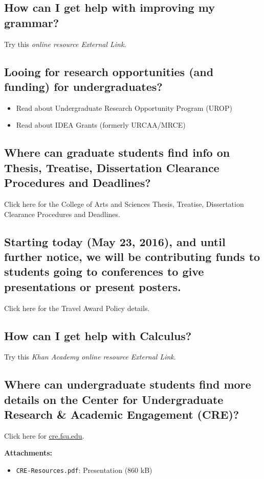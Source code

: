 \documentclass[12pt,a4paper]{article}
\begin{document}
\subsection{How can I get help with improving my grammar?}
Try this \textit{online resource External Link}.

\subsection{Looing for research opportunities (and funding) for undergraduates?}
\begin{itemize}
    \item Read about Undergraduate Research Opportunity Program (UROP)
    \item Read about IDEA Grants (formerly URCAA/MRCE)
\end{itemize}

\subsection{Where can graduate students find info on Thesis, Treatise, Dissertation Clearance Procedures and Deadlines?}
Click here for the College of Arts and Sciences Thesis, Treatise, Dissertation Clearance Procedures and Deadlines.

\subsection{Starting today (May 23, 2016), and until further notice, we will be contributing funds to students going to conferences to give presentations or present posters.}
Click here for the Travel Award Policy details.

\subsection{How can I get help with Calculus?}
Try this \textit{Khan Academy online resource External Link}.

\subsection{Where can undergraduate students find more details on the Center for Undergraduate Research \& Academic Engagement (CRE)?}
Click here for \href{http://cre.fsu.edu}{cre.fsu.edu}.
\vspace{1em}

\noindent\textbf{Attachments:}
\begin{itemize}
    \item \texttt{CRE-Resources.pdf}: Presentation (860 kB)
\end{itemize}
\end{document}
